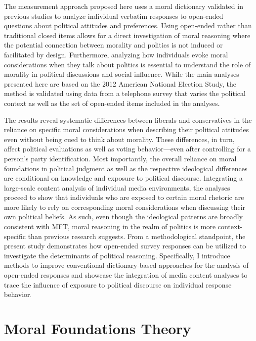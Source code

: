 \documentclass[12pt]{article}
\begin{document}
The measurement approach proposed here uses a moral dictionary validated in previous studies \citep[e.g.,][]{graham2009liberals} to analyze individual verbatim responses to open-ended questions about political attitudes and preferences. Using open-ended rather than traditional closed items allows for a direct investigation of moral reasoning where the potential connection between morality and politics is not induced or facilitated by design. Furthermore, analyzing how individuals evoke moral considerations when they talk about politics is essential to understand the role of morality in political discussions and social influence. While the main analyses presented here are based on the 2012 American National Election Study, the method is validated using data from a telephone survey that varies the political context as well as the set of open-ended items included in the analyses.

The results reveal systematic differences between liberals and conservatives in the reliance on specific moral considerations when describing their political attitudes even without being cued to think about morality. These differences, in turn, affect political evaluations as well as voting behavior---even after controlling for a person's party identification. Most importantly, the overall reliance on moral foundations in political judgment as well as the respective ideological differences are conditional on knowledge and exposure to political discourse. Integrating a large-scale content analysis of individual media environments, the analyses proceed to show that individuals who are exposed to certain moral rhetoric are more likely to rely on corresponding moral considerations when discussing their own political beliefs. As such, even though the ideological patterns are broadly consistent with MFT, moral reasoning in the realm of politics is more context-specific than previous research suggests. From a methodological standpoint, the present study demonstrates how open-ended survey responses can be utilized to investigate the determinants of political reasoning. Specifically, I introduce methods to improve conventional dictionary-based approaches for the analysis of open-ended responses and showcase the integration of media content analyses to trace the influence of exposure to political discourse on individual response behavior.


\section*{Moral Foundations Theory}
\end{document}
